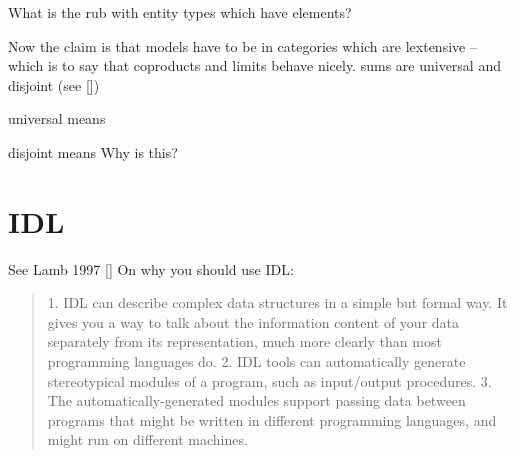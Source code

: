 \documentclass[11pt,a4paper]{scrartcl}
\begin{document}
What is the rub with entity types which have elements?

Now the claim is that models have to be in categories which are lextensive -- which is to say
that coproducts and limits behave nicely. sums are universal and disjoint (see [\cite {Carboni1993}])

universal means

disjoint means 
Why is this?

\section{IDL}
See Lamb 1997 [\cite{Lamb1997}]
On why you should use IDL:
\begin{quote}
1. IDL can describe complex data structures in a simple but formal way.
It gives you a way to talk about the information content of your data
separately from its representation, much more clearly than most programming 
languages do.
2. IDL tools can automatically generate stereotypical modules of a program,
such as input/output procedures.
3. The automatically-generated modules support passing data between programs 
that might be written in different programming languages, and
might run on different machines.
\end{quote}
  

\end{document}
